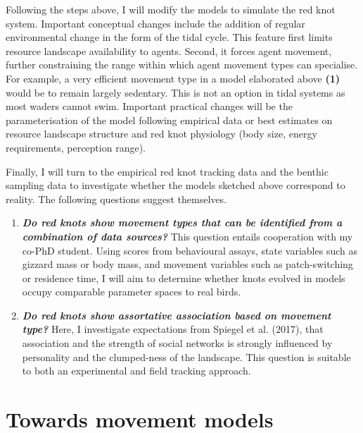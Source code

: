 \documentclass[]{scrartcl}
\begin{document}
\begin{linenumbers}
Following the steps above, I will modify the models to simulate the red
knot system. Important conceptual changes include the addition of
regular environmental change in the form of the tidal cycle. This
feature first limits resource landscape availability to agents. Second,
it forces agent movement, further constraining the range within which
agent movement types can specialise. For example, a very efficient
movement type in a model elaborated above \textbf{(1)} would be to
remain largely sedentary. This is not an option in tidal systems as most
waders cannot swim. Important practical changes will be the
parameterisation of the model following empirical data or best estimates
on resource landscape structure and red knot physiology (body size,
energy requirements, perception range).

Finally, I will turn to the empirical red knot tracking data and the
benthic sampling data to investigate whether the models sketched above
correspond to reality. The following questions suggest themselves.

\begin{enumerate}
\def\labelenumi{\arabic{enumi}.}
\item
  
  \emph{\textbf{Do red knots show movement types that can be identified
  from a combination of data sources?}} This question entails
  cooperation with my co-PhD student. Using scores from behavioural
  assays, state variables such as gizzard mass or body mass, and
  movement variables such as patch-switching or residence time, I will
  aim to determine whether knots evolved in models occupy comparable
  parameter spaces to real birds.
  
\item
  
  \textbf{\emph{Do red knots show assortative association based on
  movement type?}} Here, I investigate expectations from Spiegel et al.
  (2017), that association and the strength of social networks is
  strongly influenced by personality and the clumped-ness of the
  landscape. This question is suitable to both an experimental and field
  tracking approach.
  
\end{enumerate}

\newpage

\part{Towards movement models}\label{towards-movement-models}


\end{linenumbers}
\end{document}
